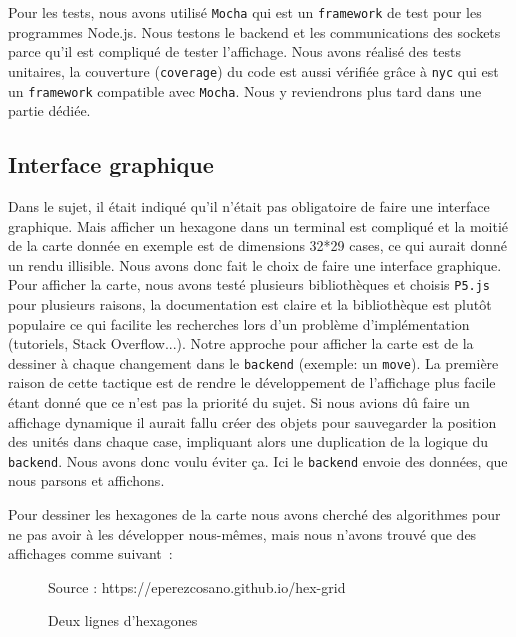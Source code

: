 Pour les tests, nous avons utilisé {\tt Mocha} qui est un {\tt framework} de test pour les programmes Node.js.
Nous testons le backend et les communications des sockets parce qu'il est compliqué de tester l'affichage.
Nous avons réalisé des tests unitaires, la couverture ({\tt coverage}) du code est aussi vérifiée grâce à {\tt nyc} qui est un {\tt framework} compatible avec {\tt Mocha}.
Nous y reviendrons plus tard dans une partie dédiée.

\subsection{Interface graphique}

Dans le sujet, il était indiqué qu'il n'était pas obligatoire de faire une interface graphique. Mais afficher un hexagone dans un terminal est compliqué et la moitié de la carte donnée en exemple est de dimensions 32*29 cases, ce qui aurait donné un rendu illisible.
Nous avons donc fait le choix de faire une interface graphique. Pour afficher la carte, nous avons testé plusieurs bibliothèques et choisis \lstinline{P5.js} pour plusieurs raisons, la documentation est claire et la bibliothèque est plutôt populaire ce qui facilite les recherches lors d'un problème d'implémentation (tutoriels, Stack Overflow...).
Notre approche pour afficher la carte est de la dessiner à chaque changement dans le \lstinline{backend} (exemple: un {\tt move}). La première raison de cette tactique est de rendre le développement de l'affichage plus facile étant donné que ce n'est pas la priorité du sujet. Si nous avions dû faire un affichage dynamique il aurait fallu créer des objets pour sauvegarder la position des unités dans chaque case, impliquant alors une duplication de la logique du \lstinline{backend}. Nous avons donc voulu éviter ça. Ici le \lstinline{backend} envoie des données, que nous parsons et affichons.

Pour dessiner les hexagones de la carte nous avons cherché des algorithmes pour ne pas avoir à les développer nous-mêmes, mais nous n'avons trouvé que des affichages comme suivant :

\begin{figure}[H]
    \centering
    \def\stackalignment{r}
    {\scriptsize%
        Source : https://eperezcosano.github.io/hex-grid}
    \caption{Deux lignes d'hexagones}
    \label{fig:hexmap_exemple}
\end{figure}

